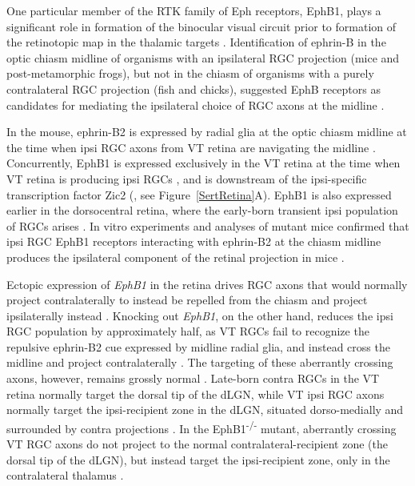 One particular member of the RTK family of Eph receptors, EphB1, plays a significant role in formation of the binocular visual circuit prior to formation of the retinotopic map in the thalamic targets \cite{petros2008retinal}.
Identification of ephrin-B in the optic chiasm midline of organisms with an ipsilateral RGC projection (mice and post-metamorphic frogs), but not in the chiasm of organisms with a purely contralateral RGC projection (fish and chicks), suggested EphB receptors as candidates for mediating the ipsilateral choice of RGC axons at the midline \cite{nakagawa2000ephrin}.

In the mouse, ephrin-B2 is expressed by radial glia at the optic chiasm midline at the time when ipsi RGC axons from VT retina are navigating the midline \cite{williams2003ephrin}.
Concurrently, EphB1 is expressed exclusively in the VT retina at the time when VT retina is producing ipsi RGCs \cite{williams2003ephrin}, and is downstream of the ipsi-specific transcription factor Zic2 (, see Figure~\ref{SertRetina}A).
EphB1 is also expressed earlier in the dorsocentral retina, where the early-born transient ipsi population of RGCs arises \cite{williams2003ephrin,drager1985birth}.
In vitro experiments and analyses of mutant mice confirmed that ipsi RGC EphB1 receptors interacting with ephrin-B2 at the chiasm midline produces the ipsilateral component of the retinal projection in mice \cite{williams2003ephrin,petros2010ephrin,petros2009specificity,chenaux2011forward}.

Ectopic expression of \emph{EphB1} in the retina drives RGC axons that would normally project contralaterally to instead be repelled from the chiasm and project ipsilaterally instead \cite{petros2009specificity}.
Knocking out \emph{EphB1}, on the other hand, reduces the ipsi RGC population by approximately half, as VT RGCs fail to recognize the repulsive ephrin-B2 cue expressed by midline radial glia, and instead cross the midline and project contralaterally \cite{williams2003ephrin}.
The targeting of these aberrantly crossing axons, however, remains grossly normal \cite{rebsam2009switching}.
Late-born contra RGCs in the VT retina normally target the dorsal tip of the dLGN, while VT ipsi RGC axons normally target the ipsi-recipient zone in the dLGN, situated dorso-medially and surrounded by contra projections \cite{rebsam2009switching,pfeiffenberger2006ephrin}.
In the EphB1\textsuperscript{-/-} mutant, aberrantly crossing VT RGC axons do not project to the normal contralateral-recipient zone (the dorsal tip of the dLGN), but instead target the ipsi-recipient zone, only in the contralateral thalamus \cite{rebsam2009switching}.

